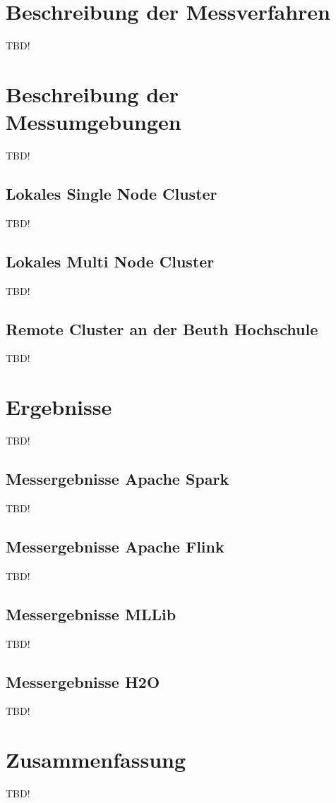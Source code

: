 \section{Beschreibung der Messverfahren}
\label{section:messumgebungen}

TBD!


\section{Beschreibung der Messumgebungen}
\label{section:messumgebungen}

TBD!

\subsection{Lokales Single Node Cluster  }
\label{section:lokales single node}

TBD!

\subsection{Lokales Multi Node Cluster}
\label{section:tachyon}

TBD!

\subsection{Remote Cluster an der Beuth Hochschule}
\label{section:remote}

TBD!

\section{Ergebnisse}
\label{section:ergebnisse}

TBD!

\subsection{Messergebnisse Apache Spark}
\label{section:spark eval}

TBD!

\subsection{Messergebnisse Apache Flink}
\label{section:mllib arch}

TBD!

\subsection{Messergebnisse MLLib}
\label{section:mllib arch}

TBD!

\subsection{Messergebnisse H2O}
\label{section:mllib arch}

TBD!



\section{Zusammenfassung}
\label{section:zusammen}



TBD!
